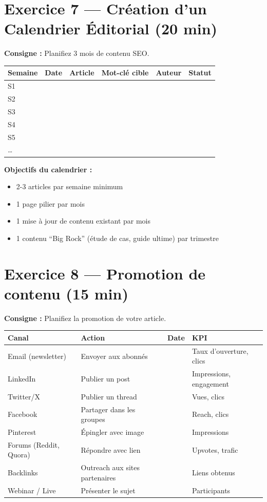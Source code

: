 \documentclass[12pt,a4paper]{report}
\begin{document}
\section{Exercice 7 --- Création d'un Calendrier Éditorial (20 min)}

\textbf{Consigne :} Planifiez 3 mois de contenu SEO.

\begin{longtable}{|l|l|l|l|l|l|}
\hline
\textbf{Semaine} & \textbf{Date} & \textbf{Article} & \textbf{Mot-clé cible} & \textbf{Auteur} & \textbf{Statut} \\
\hline
S1 & & & & & \\
\hline
S2 & & & & & \\
\hline
S3 & & & & & \\
\hline
S4 & & & & & \\
\hline
S5 & & & & & \\
\hline
\ldots & & & & & \\
\hline
\end{longtable}

\textbf{Objectifs du calendrier :}
\begin{itemize}
\item 2-3 articles par semaine minimum
\item 1 page pilier par mois
\item 1 mise à jour de contenu existant par mois
\item 1 contenu ``Big Rock'' (étude de cas, guide ultime) par trimestre
\end{itemize}

\section{Exercice 8 --- Promotion de contenu (15 min)}

\textbf{Consigne :} Planifiez la promotion de votre article.

\begin{tabular}{|l|l|l|l|}
\hline
\textbf{Canal} & \textbf{Action} & \textbf{Date} & \textbf{KPI} \\
\hline
Email (newsletter) & Envoyer aux abonnés & & Taux d'ouverture, clics \\
\hline
LinkedIn & Publier un post & & Impressions, engagement \\
\hline
Twitter/X & Publier un thread & & Vues, clics \\
\hline
Facebook & Partager dans les groupes & & Reach, clics \\
\hline
Pinterest & Épingler avec image & & Impressions \\
\hline
Forums (Reddit, Quora) & Répondre avec lien & & Upvotes, trafic \\
\hline
Backlinks & Outreach aux sites partenaires & & Liens obtenus \\
\hline
Webinar / Live & Présenter le sujet & & Participants \\
\hline
\end{tabular}
\end{document}
